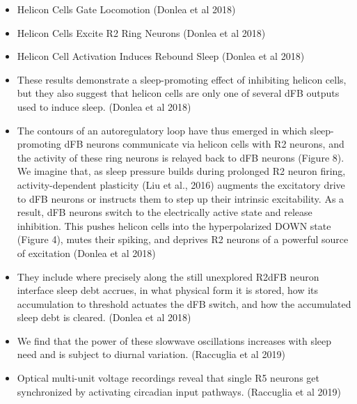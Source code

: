\documentclass[11pt]{article}
\begin{document}
\begin{itemize}
    \item Helicon Cells Gate Locomotion
    \parencite{donleaRecurrentCircuitryBalancing2018} (Donlea et al 2018)

    \item Helicon Cells Excite R2 Ring Neurons
    \parencite{donleaRecurrentCircuitryBalancing2018} (Donlea et al 2018)

    \item Helicon Cell Activation Induces Rebound Sleep
    \parencite{donleaRecurrentCircuitryBalancing2018} (Donlea et al 2018)

    \item These results demonstrate a sleep-promoting effect of inhibiting helicon cells, but they also suggest that helicon cells are only one of several dFB outputs used to induce sleep.
    \parencite{donleaRecurrentCircuitryBalancing2018} (Donlea et al 2018)

    \item The contours of an autoregulatory loop have thus emerged in which sleep-promoting dFB neurons communicate via helicon cells with R2 neurons, and the activity of these ring neurons is relayed back to dFB neurons (Figure 8). We imagine that, as sleep pressure builds during prolonged R2 neuron firing, activity-dependent plasticity (Liu et al., 2016) augments the excitatory drive to dFB neurons or instructs them to step up their intrinsic excitability. As a result, dFB neurons switch to the electrically active state and release inhibition. This pushes helicon cells into the hyperpolarized DOWN state (Figure 4), mutes their spiking, and deprives R2 neurons of a powerful source of excitation
    \parencite{donleaRecurrentCircuitryBalancing2018} (Donlea et al 2018)

    \item They include where precisely along the still unexplored R2dFB neuron interface sleep debt accrues, in what physical form it is stored, how its accumulation to threshold actuates the dFB switch, and how the accumulated sleep debt is cleared.
    \parencite{donleaRecurrentCircuitryBalancing2018} (Donlea et al 2018)

    \item We find that the power of these slowwave oscillations increases with sleep need and is subject to diurnal variation.
    \parencite{raccugliaNetworkSpecificSynchronizationElectrical2019} (Raccuglia et al 2019)
    
    \item Optical multi-unit voltage recordings reveal that single R5 neurons get synchronized by activating circadian input pathways.
    \parencite{raccugliaNetworkSpecificSynchronizationElectrical2019} (Raccuglia et al 2019)


\end{itemize}
\end{document}
